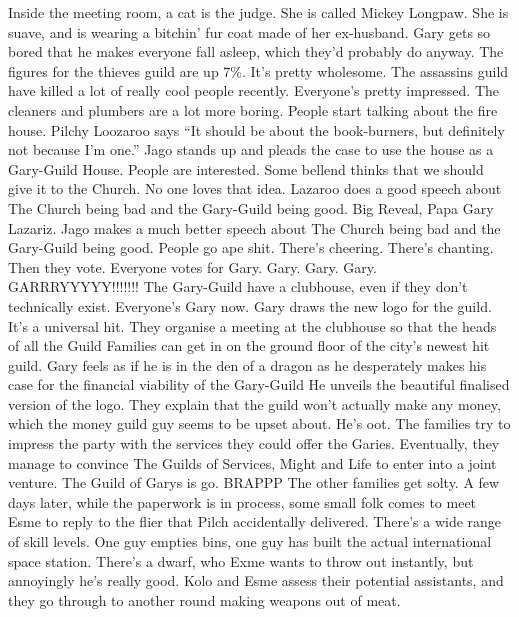 Inside the meeting room, a cat is the judge. She is called Mickey Longpaw. She is suave, and is wearing a bitchin’ fur coat made of her ex-husband.\medskip
Gary gets so bored that he makes everyone fall asleep, which they’d probably do anyway.\medskip
The figures for the thieves guild are up 7\%. It’s pretty wholesome.\medskip
The assassins guild have killed a lot of really cool people recently. Everyone’s pretty impressed.\medskip
The cleaners and plumbers are a lot more boring.\medskip
People start talking about the fire house.\medskip
Pilchy Loozaroo says “It should be about the book-burners, but definitely not because I’m one.”\medskip
Jago stands up and pleads the case to use the house as a Gary-Guild House. People are interested.\medskip
Some bellend thinks that we should give it to the Church. No one loves that idea.\medskip
Lazaroo does a good speech about The Church being bad and the Gary-Guild being good.\medskip
Big Reveal, Papa Gary Lazariz.\medskip
Jago makes a much better speech about The Church being bad and the Gary-Guild being good.\medskip
People go ape shit. There’s cheering. There’s chanting. Then they vote.\medskip
Everyone votes for Gary.\medskip
Gary. Gary. Gary. GARRRYYYYY!!!!!!!\medskip
The Gary-Guild have a clubhouse, even if they don’t technically exist.\medskip
Everyone’s Gary now.\medskip
Gary draws the new logo for the guild. It’s a universal hit.\medskip
They organise a meeting at the clubhouse so that the heads of all the Guild Families can get in on the ground floor of the city’s newest hit guild.\medskip
Gary feels as if he is in the den of a dragon as he desperately makes his case for the financial viability of the Gary-Guild\medskip
He unveils the beautiful finalised version of the logo.\medskip
They explain that the guild won’t actually make any money, which the money guild guy seems to be upset about.\medskip
He’s oot.\medskip
The families try to impress the party with the services they could offer the Garies.\medskip
Eventually, they manage to convince The Guilds of Services, Might and Life to enter into a joint venture.\medskip
The Guild of Garys is go. BRAPPP\medskip
The other families get solty.\medskip
A few days later, while the paperwork is in process, some small folk comes to meet Esme to reply to the flier that Pilch accidentally delivered.\medskip
There’s a wide range of skill levels. One guy empties bins, one guy has built the actual international space station.\medskip
There’s a dwarf, who Exme wants to throw out instantly, but annoyingly he’s really good.\medskip
Kolo and Esme assess their potential assistants, and they go through to another round making weapons out of meat.\medskip
